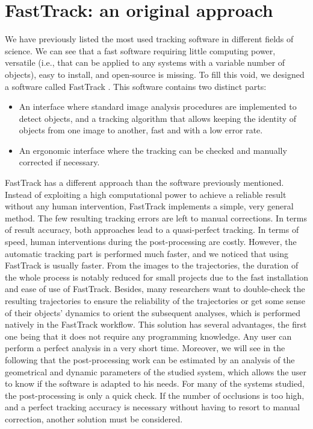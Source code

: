     \section{FastTrack: an original approach}
    We have previously listed the most used tracking software in different fields of science. We can see that a fast software requiring little computing power, versatile (i.e., that can be applied to any systems with a variable number of objects), easy to install, and open-source is missing.
    To fill this void, we designed a software called FastTrack \cite{gallois2021fasttrack}. This software contains two distinct parts:
    \begin{itemize}
        \item An interface where standard image analysis procedures are implemented to detect objects, and a tracking algorithm that allows keeping the identity of objects from one image to another, fast and with a low error rate.
        \item An ergonomic interface where the tracking can be checked and manually corrected if necessary.
    \end{itemize}
    FastTrack has a different approach than the software previously mentioned. Instead of exploiting a high computational power to achieve a reliable result without any human intervention, FastTrack implements a simple, very general method. The few resulting tracking errors are left to manual corrections. In terms of result accuracy, both approaches lead to a quasi-perfect tracking. In terms of speed, human interventions during the post-processing are costly. However, the automatic tracking part is performed much faster, and we noticed that using FastTrack is usually faster. From the images to the trajectories, the duration of the whole process is notably reduced for small projects due to the fast installation and ease of use of FastTrack. Besides, many researchers want to double-check the resulting trajectories to ensure the reliability of the trajectories or get some sense of their objects' dynamics to orient the subsequent analyses, which is performed natively in the FastTrack workflow. This solution has several advantages, the first one being that it does not require any programming knowledge. Any user can perform a perfect analysis in a very short time. Moreover, we will see in the following that the post-processing work can be estimated by an analysis of the geometrical and dynamic parameters of the studied system, which allows the user to know if the software is adapted to his needs. For many of the systems studied, the post-processing is only a quick check. If the number of occlusions is too high, and a perfect tracking accuracy is necessary without having to resort to manual correction, another solution must be considered.

